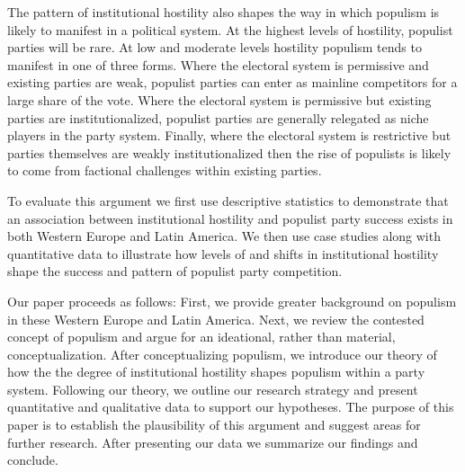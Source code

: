 \documentclass[a4paper,12pt]{article}\usepackage[]{graphicx}\usepackage[]{color}
\begin{document}
\par 
The pattern of institutional hostility also shapes the way in which populism is likely to manifest in a political system. At the highest levels of hostility, populist parties will be rare. At low and moderate levels hostility populism tends to manifest in one of three forms. Where the electoral system is permissive and existing parties are weak, populist parties can enter as mainline competitors for a large share of the vote. Where the electoral system is permissive but existing parties are institutionalized, populist parties are generally relegated as niche players in the party system. Finally, where the electoral system is restrictive but parties themselves are weakly institutionalized then the rise of populists is likely to come from factional challenges within existing parties.
\par 
To evaluate this argument we first use descriptive statistics to demonstrate that an association between institutional hostility and populist party success exists in both Western Europe and Latin America. We then use case studies along with quantitative data to illustrate how levels of and shifts in institutional hostility shape the success and pattern of populist party competition. 
\par
Our paper proceeds as follows: First, we provide greater background on populism in these Western Europe and Latin America. Next, we review the contested concept of populism and argue for an ideational, rather than material, conceptualization. After conceptualizing populism, we introduce our theory of how the the degree of institutional hostility shapes populism within a party system. Following our theory, we outline our research strategy and present quantitative and qualitative data to support our hypotheses. The purpose of this paper is to establish the plausibility of this argument and suggest areas for further research. After presenting our data we summarize our findings and conclude.
\end{document}
